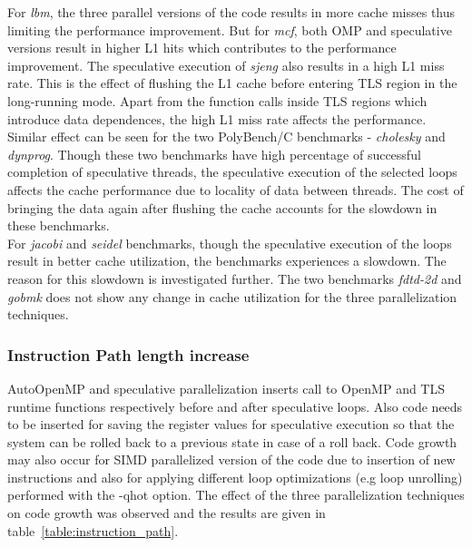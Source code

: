 \documentclass[10pt]{report}          %
\begin{document}
For \textit{lbm}, the three parallel versions of the code results in more cache misses thus limiting the performance improvement.  But for \textit{mcf}, both OMP and speculative versions result in higher L1 hits which contributes to the performance improvement.  The speculative execution of \textit{sjeng} also results in a high L1 miss rate.  This is the effect of flushing the L1 cache before entering TLS region in the long-running mode.  Apart from the function calls inside TLS regions which introduce data dependences, the high L1 miss rate affects the performance. \\

Similar effect can be seen for the two PolyBench/C benchmarks - \textit{cholesky} and \textit{dynprog}.  Though these two benchmarks have high percentage of successful completion of speculative threads, the speculative execution of the selected loops affects the cache performance due to locality of data between threads.  The cost of bringing the data again after flushing the cache accounts for the slowdown in these benchmarks. \\

For \textit{jacobi} and \textit{seidel} benchmarks, though the speculative execution of the loops result in better cache utilization, the benchmarks experiences a slowdown.  The reason for this slowdown is investigated further.  The two benchmarks \textit{fdtd-2d} and \textit{gobmk} does not show any change in cache utilization for the three parallelization techniques.

\subsubsection{Instruction Path length increase}

AutoOpenMP and speculative parallelization inserts call to OpenMP and TLS runtime functions respectively before and after speculative loops.  Also code needs to be inserted for saving the register values for speculative execution so that the system can be rolled back to a previous state in case of a roll back.  Code growth may also occur for SIMD parallelized version of the code due to insertion of new instructions and also for applying different loop optimizations (e.g loop unrolling) performed with the -qhot option.  The effect of the three parallelization techniques on code growth was observed and the results are given in table~\ref{table:instruction_path}. \\
\end{document}
